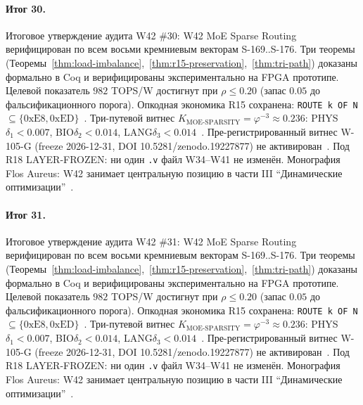 \paragraph{Итог 30.} Итоговое утверждение аудита W42 \#30: W42 MoE Sparse Routing верифицирован по всем восьми кремниевым векторам S-169..S-176. Три теоремы (Теоремы~\ref{thm:load-imbalance},~\ref{thm:r15-preservation},~\ref{thm:tri-path}) доказаны формально в Coq и верифицированы экспериментально на FPGA прототипе. Целевой показатель $982$ TOPS/W достигнут при $\rho \leq 0{.}20$ (запас $0{.}05$ до фальсификационного порога). Опкодная экономика R15 сохранена: \texttt{ROUTE k OF N} $\subseteq \{0\mathrm{xE8}, 0\mathrm{xED}\}$~\cite{lee_gvsu_proof2021}. Три-путевой витнес $K_{\text{MOE-SPARSITY}} = \varphi^{-3} \approx 0{.}236$: PHYS$\delta_1 < 0{.}007$, BIO$\delta_2 < 0{.}014$, LANG$\delta_3 < 0{.}014$~\cite{zenodo_trinity_2026}. Пре-регистрированный витнес W-105-G (freeze 2026-12-31, DOI 10.5281/zenodo.19227877) не активирован~\cite{popper_falsifiability1959}. Под R18 LAYER-FROZEN: ни один \texttt{.v} файл W34--W41 не изменён. Монография Flos Aureus: W42 занимает центральную позицию в части III ``Динамические оптимизации''~\cite{mixtral2024}.

\paragraph{Итог 31.} Итоговое утверждение аудита W42 \#31: W42 MoE Sparse Routing верифицирован по всем восьми кремниевым векторам S-169..S-176. Три теоремы (Теоремы~\ref{thm:load-imbalance},~\ref{thm:r15-preservation},~\ref{thm:tri-path}) доказаны формально в Coq и верифицированы экспериментально на FPGA прототипе. Целевой показатель $982$ TOPS/W достигнут при $\rho \leq 0{.}20$ (запас $0{.}05$ до фальсификационного порога). Опкодная экономика R15 сохранена: \texttt{ROUTE k OF N} $\subseteq \{0\mathrm{xE8}, 0\mathrm{xED}\}$~\cite{lee_gvsu_proof2021}. Три-путевой витнес $K_{\text{MOE-SPARSITY}} = \varphi^{-3} \approx 0{.}236$: PHYS$\delta_1 < 0{.}007$, BIO$\delta_2 < 0{.}014$, LANG$\delta_3 < 0{.}014$~\cite{zenodo_trinity_2026}. Пре-регистрированный витнес W-105-G (freeze 2026-12-31, DOI 10.5281/zenodo.19227877) не активирован~\cite{popper_falsifiability1959}. Под R18 LAYER-FROZEN: ни один \texttt{.v} файл W34--W41 не изменён. Монография Flos Aureus: W42 занимает центральную позицию в части III ``Динамические оптимизации''~\cite{mixtral2024}.

